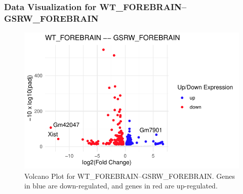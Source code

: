 \documentclass[
  letterpaper,
  DIV=11,
  numbers=noendperiod]{scrartcl}
\newenvironment{Shaded}{\begin{snugshade}}{\end{snugshade}}
\newcommand{\NormalTok}[1]{\textcolor[rgb]{0.00,0.23,0.31}{#1}}
\newcommand{\SpecialCharTok}[1]{\textcolor[rgb]{0.37,0.37,0.37}{#1}}
\begin{document}
\hypertarget{data-visualization-for-wt_forebraingsrw_forebrain}{%
\subsubsection{Data Visualization for
WT\_FOREBRAIN--GSRW\_FOREBRAIN}\label{data-visualization-for-wt_forebraingsrw_forebrain}}

\begin{Shaded}
\end{Shaded}

\begin{figure}[H]

{\centering \includegraphics{sample_report_trial_files/figure-pdf/fig-volcano_1-1.pdf}

}

\caption{\label{fig-volcano_1}Volcano Plot for
WT\_FOREBRAIN--GSRW\_FOREBRAIN. Genes in blue are down-regulated, and
genes in red are up-regulated.}

\end{figure}

\begin{Shaded}
\end{Shaded}
\end{document}
